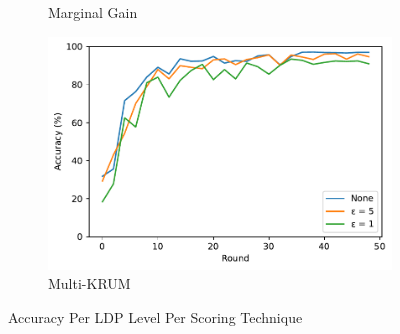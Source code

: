 \begin{figure}[!ht]
\begin{subfigure}[b]{0.49\textwidth}
        \caption{Marginal Gain}
    \end{subfigure}
    \hfill
    \begin{subfigure}[b]{0.49\textwidth}
        \centering
        \includegraphics[width=\textwidth]{graphics/05_priv_accuracy_multikrum.pdf}
        \caption{Multi-KRUM}
    \end{subfigure}
    \caption{Accuracy Per LDP Level Per Scoring Technique}
    \label{fig:accuracy_priv}
\end{figure}






